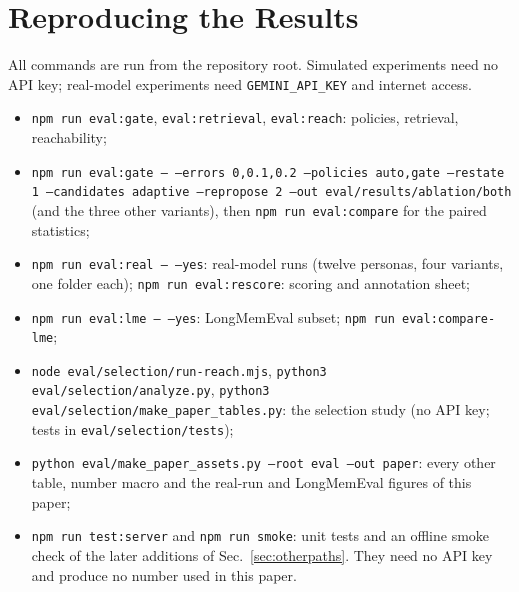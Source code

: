 \IfFileExists{IEEEtran.cls}{\documentclass[journal]{IEEEtran}\def\HAVEIEEE{1}}{\documentclass[10pt,twocolumn]{article}\usepackage[margin=0.7in,columnsep=0.25in]{geometry}}
\begin{document}
\section{Reproducing the Results}
All commands are run from the repository root. Simulated experiments need no API key; real-model experiments need \texttt{GEMINI\_API\_KEY} and internet access.
\begin{itemize}\setlength\itemsep{0pt}
\item \texttt{npm run eval:gate}, \texttt{eval:retrieval}, \texttt{eval:reach}: policies, retrieval, reachability;
\item \texttt{npm run eval:gate -- --errors 0,0.1,0.2 --policies auto,gate --restate 1 --candidates adaptive --repropose 2 --out eval/results/ablation/both} (and the three other variants), then \texttt{npm run eval:compare} for the paired statistics;
\item \texttt{npm run eval:real -- --yes}: real-model runs (twelve personas, four variants, one folder each); \texttt{npm run eval:rescore}: scoring and annotation sheet;
\item \texttt{npm run eval:lme -- --yes}: LongMemEval subset; \texttt{npm run eval:compare-lme};
\item \texttt{node eval/selection/run-reach.mjs}, \texttt{python3 eval/selection/analyze.py}, \texttt{python3 eval/selection/\allowbreak make\_paper\_tables.py}: the selection study (no API key; tests in \texttt{eval/selection/tests});
\item \texttt{python eval/make\_paper\_assets.py --root eval --out paper}: every other table, number macro and the real-run and LongMemEval figures of this paper;
\item \texttt{npm run test:server} and \texttt{npm run smoke}: unit tests and an offline smoke check of the later additions of Sec.~\ref{sec:otherpaths}. They need no API key and produce no number used in this paper.
\end{itemize}

\ifdefined\HAVEIEEE\else\fi

\end{document}

